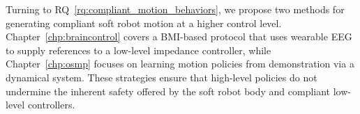
Turning to \gls{RQ}~\ref{rq:compliant_motion_behaviors}, we propose two methods for generating compliant soft robot motion at a higher control level. Chapter~\ref{chp:braincontrol} covers a \gls{BMI}-based protocol that uses wearable \gls{EEG} to supply references to a low-level impedance controller, while Chapter~\ref{chp:osmp} focuses on learning motion policies from demonstration via a dynamical system. These strategies ensure that high-level policies do not undermine the inherent safety offered by the soft robot body and compliant low-level controllers.

